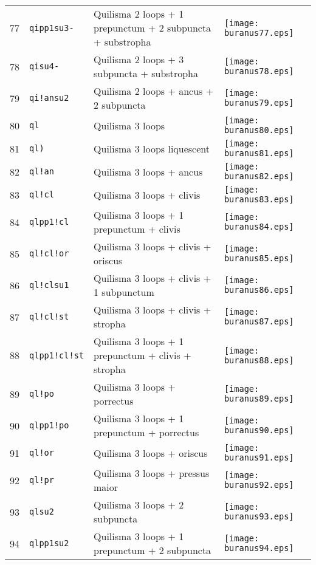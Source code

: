 \documentclass{scrarticle}
\begin{document}
\begin{longtable}{l|l|l|l}
77 & \texttt{qipp1su3-} & Quilisma 2 loops + 1 prepunctum + 2 subpuncta + substropha & \texttt{[image: buranus77.eps]} \\
78 & \texttt{qisu4-} & Quilisma 2 loops + 3 subpuncta + substropha & \texttt{[image: buranus78.eps]} \\
79 & \texttt{qi!ansu2} & Quilisma 2 loops + ancus + 2 subpuncta & \texttt{[image: buranus79.eps]} \\
80 & \texttt{ql} & Quilisma 3 loops & \texttt{[image: buranus80.eps]} \\
81 & \texttt{ql)} & Quilisma 3 loops liquescent & \texttt{[image: buranus81.eps]} \\
82 & \texttt{ql!an} & Quilisma 3 loops + ancus & \texttt{[image: buranus82.eps]} \\
83 & \texttt{ql!cl} & Quilisma 3 loops + clivis & \texttt{[image: buranus83.eps]} \\
84 & \texttt{qlpp1!cl} & Quilisma 3 loops + 1 prepunctum + clivis & \texttt{[image: buranus84.eps]} \\
85 & \texttt{ql!cl!or} & Quilisma 3 loops + clivis + oriscus & \texttt{[image: buranus85.eps]} \\
86 & \texttt{ql!clsu1} & Quilisma 3 loops + clivis + 1 subpunctum & \texttt{[image: buranus86.eps]} \\
87 & \texttt{ql!cl!st} & Quilisma 3 loops + clivis + stropha & \texttt{[image: buranus87.eps]} \\
88 & \texttt{qlpp1!cl!st} & Quilisma 3 loops + 1 prepunctum + clivis + stropha & \texttt{[image: buranus88.eps]} \\
89 & \texttt{ql!po} & Quilisma 3 loops + porrectus & \texttt{[image: buranus89.eps]} \\
90 & \texttt{qlpp1!po} & Quilisma 3 loops + 1 prepunctum + porrectus & \texttt{[image: buranus90.eps]} \\
91 & \texttt{ql!or} & Quilisma 3 loops + oriscus & \texttt{[image: buranus91.eps]} \\
92 & \texttt{ql!pr} & Quilisma 3 loops + pressus maior & \texttt{[image: buranus92.eps]} \\
93 & \texttt{qlsu2} & Quilisma 3 loops + 2 subpuncta & \texttt{[image: buranus93.eps]} \\
94 & \texttt{qlpp1su2} & Quilisma 3 loops + 1 prepunctum + 2 subpuncta & \texttt{[image: buranus94.eps]} \\

\end{longtable}
\end{document}
